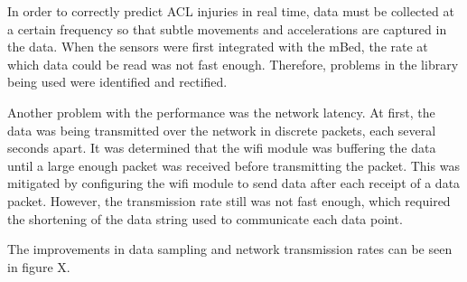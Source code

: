 In order to correctly predict ACL injuries in real time, data must be collected at a certain frequency so that subtle movements and accelerations are captured in the data. When the sensors were first integrated with the mBed, the rate at which data could be read was not fast enough. Therefore, problems in the library being used were identified and rectified.

Another problem with the performance was the network latency. At first, the data was being transmitted over the network in discrete packets, each several seconds apart. It was determined that the wifi module was buffering the data until a large enough packet was received before transmitting the packet. This was mitigated by configuring the wifi module to send data after each receipt of a data packet. However, the transmission rate still was not fast enough, which required the shortening of the data string used to communicate each data point.

The improvements in data sampling and network transmission rates can be seen in figure X.
